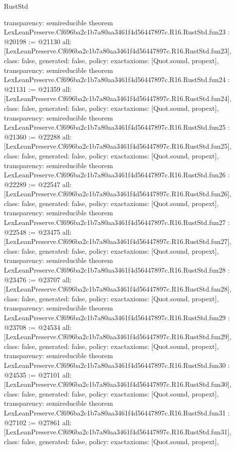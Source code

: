 \begin{lexlean}{RustStd}
\begin{coremodule}
{  transparency: semireducible
}
theorem LexLeanPreserve.Cf696ba2c1b7a80aa3461f4d56447897c.R16.RustStd.fun23 : @20198 := @21130 {
  all: [LexLeanPreserve.Cf696ba2c1b7a80aa3461f4d56447897c.R16.RustStd.fun23],
  class: false,
  generated: false,
  policy: exact{axioms: [Quot.sound, propext]},
  transparency: semireducible
}
theorem LexLeanPreserve.Cf696ba2c1b7a80aa3461f4d56447897c.R16.RustStd.fun24 : @21131 := @21359 {
  all: [LexLeanPreserve.Cf696ba2c1b7a80aa3461f4d56447897c.R16.RustStd.fun24],
  class: false,
  generated: false,
  policy: exact{axioms: [Quot.sound, propext]},
  transparency: semireducible
}
theorem LexLeanPreserve.Cf696ba2c1b7a80aa3461f4d56447897c.R16.RustStd.fun25 : @21360 := @22288 {
  all: [LexLeanPreserve.Cf696ba2c1b7a80aa3461f4d56447897c.R16.RustStd.fun25],
  class: false,
  generated: false,
  policy: exact{axioms: [Quot.sound, propext]},
  transparency: semireducible
}
theorem LexLeanPreserve.Cf696ba2c1b7a80aa3461f4d56447897c.R16.RustStd.fun26 : @22289 := @22547 {
  all: [LexLeanPreserve.Cf696ba2c1b7a80aa3461f4d56447897c.R16.RustStd.fun26],
  class: false,
  generated: false,
  policy: exact{axioms: [Quot.sound, propext]},
  transparency: semireducible
}
theorem LexLeanPreserve.Cf696ba2c1b7a80aa3461f4d56447897c.R16.RustStd.fun27 : @22548 := @23475 {
  all: [LexLeanPreserve.Cf696ba2c1b7a80aa3461f4d56447897c.R16.RustStd.fun27],
  class: false,
  generated: false,
  policy: exact{axioms: [Quot.sound, propext]},
  transparency: semireducible
}
theorem LexLeanPreserve.Cf696ba2c1b7a80aa3461f4d56447897c.R16.RustStd.fun28 : @23476 := @23707 {
  all: [LexLeanPreserve.Cf696ba2c1b7a80aa3461f4d56447897c.R16.RustStd.fun28],
  class: false,
  generated: false,
  policy: exact{axioms: [Quot.sound, propext]},
  transparency: semireducible
}
theorem LexLeanPreserve.Cf696ba2c1b7a80aa3461f4d56447897c.R16.RustStd.fun29 : @23708 := @24534 {
  all: [LexLeanPreserve.Cf696ba2c1b7a80aa3461f4d56447897c.R16.RustStd.fun29],
  class: false,
  generated: false,
  policy: exact{axioms: [Quot.sound, propext]},
  transparency: semireducible
}
theorem LexLeanPreserve.Cf696ba2c1b7a80aa3461f4d56447897c.R16.RustStd.fun30 : @24535 := @27101 {
  all: [LexLeanPreserve.Cf696ba2c1b7a80aa3461f4d56447897c.R16.RustStd.fun30],
  class: false,
  generated: false,
  policy: exact{axioms: [Quot.sound, propext]},
  transparency: semireducible
}
theorem LexLeanPreserve.Cf696ba2c1b7a80aa3461f4d56447897c.R16.RustStd.fun31 : @27102 := @27861 {
  all: [LexLeanPreserve.Cf696ba2c1b7a80aa3461f4d56447897c.R16.RustStd.fun31],
  class: false,
  generated: false,
  policy: exact{axioms: [Quot.sound, propext]},
}
\end{coremodule}
\end{lexlean}
